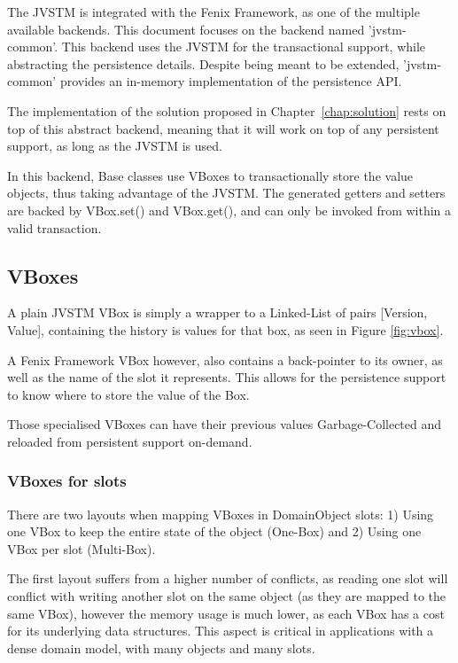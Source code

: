 The JVSTM is integrated with the Fenix Framework, as one of the
multiple available backends. This document focuses on the backend
named 'jvstm-common'. This backend uses the JVSTM for the
transactional support, while abstracting the persistence
details. Despite being meant to be extended, 'jvstm-common' provides
an in-memory implementation of the persistence API.

The implementation of the solution proposed in
Chapter~\ref{chap:solution} rests on top of this abstract backend,
meaning that it will work on top of any persistent support, as long as
the JVSTM is used.

In this backend, Base classes use VBoxes to transactionally store the
value objects, thus taking advantage of the JVSTM. The generated
getters and setters are backed by VBox.set() and VBox.get(), and can
only be invoked from within a valid transaction.

\subsection{VBoxes}

A plain JVSTM VBox is simply a wrapper to a Linked-List of pairs
[Version, Value], containing the history is values for that
box, as seen in Figure \ref{fig:vbox}.

A Fenix Framework VBox however, also contains a back-pointer to its
owner, as well as the name of the slot it represents. This allows for
the persistence support to know where to store the value of the Box.

Those specialised VBoxes can have their previous values
Garbage-Collected and reloaded from persistent support on-demand.

\subsubsection{VBoxes for slots}

There are two layouts when mapping VBoxes in DomainObject slots: 1)
Using one VBox to keep the entire state of the object (One-Box) and 2)
Using one VBox per slot (Multi-Box).

The first layout suffers from a higher number of conflicts, as reading
one slot will conflict with writing another slot on the same object
(as they are mapped to the same VBox), however the memory usage is
much lower, as each VBox has a cost for its underlying data
structures. This aspect is critical in applications with a dense
domain model, with many objects and many slots.

